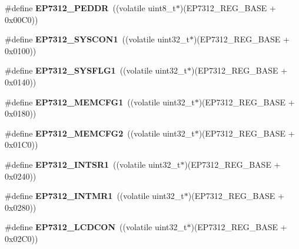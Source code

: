\begin{DoxyCompactItemize}
\#define {\bfseries E\+P7312\+\_\+\+P\+E\+D\+DR}~((volatile uint8\+\_\+t$\ast$)(E\+P7312\+\_\+\+R\+E\+G\+\_\+\+B\+A\+SE + 0x00\+C0))
\item 
\mbox{\label{group__edb7312__registers_gaf70e2d30e0577fc451a5823d844e98a8}} 
\#define {\bfseries E\+P7312\+\_\+\+S\+Y\+S\+C\+O\+N1}~((volatile uint32\+\_\+t$\ast$)(E\+P7312\+\_\+\+R\+E\+G\+\_\+\+B\+A\+SE + 0x0100))
\item 
\mbox{\label{group__edb7312__registers_gaef826796c6379138f29c2962c477c66d}} 
\#define {\bfseries E\+P7312\+\_\+\+S\+Y\+S\+F\+L\+G1}~((volatile uint32\+\_\+t$\ast$)(E\+P7312\+\_\+\+R\+E\+G\+\_\+\+B\+A\+SE + 0x0140))
\item 
\mbox{\label{group__edb7312__registers_ga3bb2a341436c9f1fff9d6b7c41322e77}} 
\#define {\bfseries E\+P7312\+\_\+\+M\+E\+M\+C\+F\+G1}~((volatile uint32\+\_\+t$\ast$)(E\+P7312\+\_\+\+R\+E\+G\+\_\+\+B\+A\+SE + 0x0180))
\item 
\mbox{\label{group__edb7312__registers_ga480bb384b23d935fbcbcd6bbc6ae4205}} 
\#define {\bfseries E\+P7312\+\_\+\+M\+E\+M\+C\+F\+G2}~((volatile uint32\+\_\+t$\ast$)(E\+P7312\+\_\+\+R\+E\+G\+\_\+\+B\+A\+SE + 0x01\+C0))
\item 
\mbox{\label{group__edb7312__registers_ga2d8db844e4ab0d12233291cec275a5da}} 
\#define {\bfseries E\+P7312\+\_\+\+I\+N\+T\+S\+R1}~((volatile uint32\+\_\+t$\ast$)(E\+P7312\+\_\+\+R\+E\+G\+\_\+\+B\+A\+SE + 0x0240))
\item 
\mbox{\label{group__edb7312__registers_ga569518a6f89feca89603b2097cd55fac}} 
\#define {\bfseries E\+P7312\+\_\+\+I\+N\+T\+M\+R1}~((volatile uint32\+\_\+t$\ast$)(E\+P7312\+\_\+\+R\+E\+G\+\_\+\+B\+A\+SE + 0x0280))
\item 
\mbox{\label{group__edb7312__registers_gadce59e24644d0b4b57636c5393f915a5}} 
\#define {\bfseries E\+P7312\+\_\+\+L\+C\+D\+C\+ON}~((volatile uint32\+\_\+t$\ast$)(E\+P7312\+\_\+\+R\+E\+G\+\_\+\+B\+A\+SE + 0x02\+C0))
\item 
\mbox{\label{group__edb7312__registers_ga8dc8951018399880fdf21f5c3be42ab6}} 

\end{DoxyCompactItemize}

